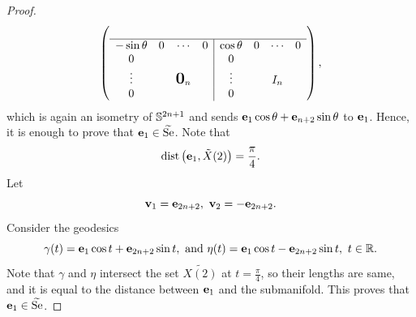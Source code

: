 \begin{proof}
\begin{displaymath}
\begin{pmatrix}
\begin{array}{cccc|cccc}
				\\ \hline
				-\sin \theta  & 0 & \cdots & 0 & \cos \theta & 0 & \cdots & 0 
				\\
				0 &  &&   & 0 &  && 
				\\
				\vdots &  &\mbox{\normalfont\Large\bfseries 0}_n&   & \vdots &  &I_n& 
				\\
				0 &  &&   & 0 &  &&  
				\\
			\end{array}
		\end{pmatrix},
	\end{displaymath}
	which is again an isometry of $\mathbb{S}^{2n+1}$ and sends $\mathbf{e} _1\cos\theta+\mathbf{e}_{n+2}\sin \theta$ to $\mathbf{e}_1$. Hence, it is enough to prove that $\mathbf{e} _1\in \widetilde{\mathrm{Se}}$.
	Note that 
	\begin{displaymath}
		\operatorname{dist} \left(\mathbf{e}_1,\tilde{X}(2)\right)=\frac{\pi}{4}.
	\end{displaymath}
	Let
	\begin{displaymath}
		 \mathbf{v}_1 = \mathbf{e}_{2n+2},~\mathbf{v}_2=-\mathbf{e}_{2n+2}.
	\end{displaymath}
	Consider the geodesics 
	\begin{displaymath}
		 \gamma(t)=\mathbf{e}_1\cos t+\mathbf{e}_{2n+2}\sin t,\text{ and } \eta(t) = \mathbf{e}_1\cos t-\mathbf{e}_{2n+2}\sin t,~t\in \mathbb{R}. 
	\end{displaymath}
	Note that $\gamma$ and $\eta$ intersect the set $\tilde{X(2)}$ at $t=\frac{\pi}{4}$, so their lengths are same, and it is equal to the distance between $\mathbf{e}_1$ and the submanifold. This proves that $\mathbf{e}_1\in \widetilde{\mathrm{Se}}$. 


\end{proof}
